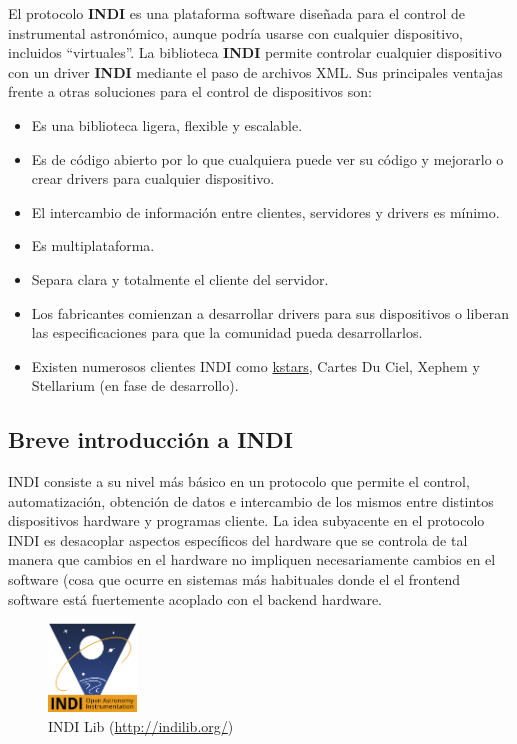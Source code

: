\bigskip
El protocolo \textbf{INDI} es una plataforma software diseñada para el control de instrumental astronómico, aunque podría usarse con cualquier dispositivo, incluidos ``virtuales''. La biblioteca \textbf{INDI} permite controlar cualquier dispositivo con un driver \textbf{INDI} mediante el paso de archivos XML. Sus principales ventajas frente a otras soluciones para el control de dispositivos son:


\begin{itemize}
	\item Es una biblioteca ligera, flexible y escalable.
	\item Es de código abierto por lo que cualquiera puede ver su código y mejorarlo o crear drivers para cualquier dispositivo.
	\item El intercambio de información entre clientes, servidores y drivers es mínimo.
	\item Es multiplataforma.
	\item Separa clara y totalmente el cliente del servidor.
	\item Los fabricantes comienzan a desarrollar drivers para sus dispositivos o liberan las especificaciones para que la comunidad pueda desarrollarlos.
	\item Existen numerosos clientes INDI como \href{https://edu.kde.org/kstars/}{kstars}, Cartes Du Ciel, Xephem y Stellarium (en fase de desarrollo).
	
\end{itemize}


\bigskip

\subsection{Breve introducción a INDI}

INDI consiste a su nivel más básico en un protocolo que permite el control, automatización, obtención de datos e intercambio de los mismos entre distintos dispositivos hardware y programas cliente. La idea subyacente en el protocolo INDI es desacoplar aspectos específicos del hardware que se controla de tal manera que cambios en el hardware no impliquen necesariamente cambios en el software (cosa que ocurre en sistemas más habituales donde el el frontend software está fuertemente acoplado con el backend hardware.

\bigskip
\begin{figure}[!ht]
	\begin{center}
		\includegraphics[width=0.21\textwidth]{../images/indi.png}
		\caption[INDI Logo]{INDI Lib (\href{http://indilib.org/}{http://indilib.org/})}
		\label{fig:ascom}
	\end{center}
\end{figure}


